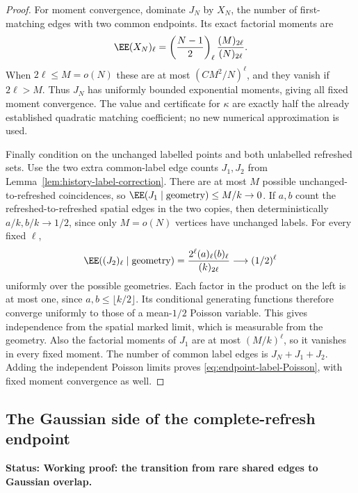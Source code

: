 \documentclass[11pt,letterpaper]{article}
\newcommand{\status}[1]{\textbf{Status: #1.}}
\begin{document}
\begin{proof}
For moment convergence, dominate $J_N$ by $X_N$, the number
of first-matching edges with two common endpoints. Its exact
factorial moments are
\[
 \EE(X_N)_\ell
    =\left(\frac{N-1}{2}\right)_\ell
                      \frac{(M)_{2\ell}}{(N)_{2\ell}}.
\]
When $2\ell\le M=o(N)$ these are at most
$(C M^2/N)^\ell$, and they vanish if $2\ell>M$.
Thus $J_N$ has uniformly bounded exponential moments, giving
all fixed moment convergence. The value and certificate for
$\kappa$ are exactly half the already established quadratic
matching coefficient; no new numerical approximation is used.

Finally condition on the unchanged labelled points and both
unlabelled refreshed sets. Use the two extra common-label
edge counts $J_1,J_2$ from Lemma~\ref{lem:history-label-correction}.
There are at most $M$ possible unchanged-to-refreshed
coincidences, so $\EE(J_1\mid\text{geometry})\le M/k\to0$.
If $a,b$ count the refreshed-to-refreshed spatial edges in
the two copies, then deterministically $a/k,b/k\to1/2$,
since only $M=o(N)$ vertices have unchanged labels.
For every fixed $\ell$,
\[
 \EE((J_2)_\ell\mid\text{geometry})
       =\frac{2^\ell(a)_\ell(b)_\ell}{(k)_{2\ell}}
       \longrightarrow(1/2)^\ell
\]
uniformly over the possible geometries. Each factor in the
product on the left is at most one, since $a,b\le\lfloor k/2\rfloor$.
Its conditional generating functions therefore converge uniformly
to those of a mean-$1/2$ Poisson variable. This gives independence
from the spatial marked limit, which is measurable from the
geometry. Also the factorial moments of $J_1$ are at most
$(M/k)^\ell$, so it vanishes in every fixed moment.
The number of common label edges is $J_N+J_1+J_2$.
Adding the independent Poisson limits proves
\eqref{eq:endpoint-label-Poisson}, with fixed moment convergence
as well.
\end{proof}

\subsection{The Gaussian side of the complete-refresh endpoint}
\label{sec:endpoint-Gaussian}

\status{Working proof: the transition from rare shared edges to Gaussian overlap}
\end{document}
